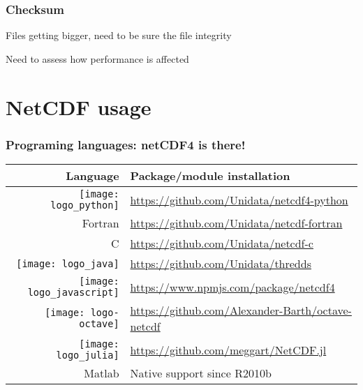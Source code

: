 
\begin{frame}
\frametitle{Checksum}

\parskip 1cm
Files getting bigger, need to be sure the file integrity

Need to assess how performance is affected



\end{frame}

\section{NetCDF usage}

\begin{frame}

\end{frame}


\begin{frame}
\frametitle{Programing languages: netCDF4 is there!}
\begin{table}
\begin{tabular}{rl}
\toprule
Language 	& 		Package/module installation \\
\midrule
\texttt{[image: logo\_python]}		& 		\url{https://github.com/Unidata/netcdf4-python}\\
Fortran											& 		\url{https://github.com/Unidata/netcdf-fortran}\\
C												& 		\url{https://github.com/Unidata/netcdf-c}\\
\texttt{[image: logo\_java]}			& 		\url{https://github.com/Unidata/thredds}\\
\texttt{[image: logo\_javascript]}	& 		\url{https://www.npmjs.com/package/netcdf4}\\
\texttt{[image: logo-octave]}		&		\url{https://github.com/Alexander-Barth/octave-netcdf}\\
\texttt{[image: logo\_julia]}		&  		\url{https://github.com/meggart/NetCDF.jl}\\
Matlab											&		Native support since R2010b\\
\bottomrule
\end{tabular}
\end{table}


\end{frame}

